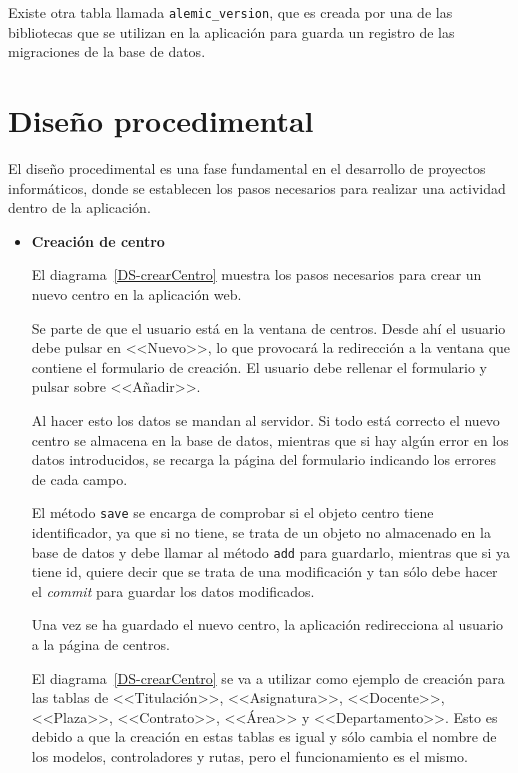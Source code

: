 Existe otra tabla llamada \texttt{alemic\_version}, que es creada por una de las bibliotecas que se utilizan en la aplicación para guarda un registro de las migraciones de la base de datos. 

\section{Diseño procedimental}
El diseño procedimental es una fase fundamental en el desarrollo de proyectos informáticos, donde se establecen los pasos necesarios para realizar una actividad dentro de la aplicación.

\begin{itemize}
\item \textbf{Creación de centro}

El diagrama~\ref{DS-crearCentro} muestra los pasos necesarios para crear un nuevo centro en la aplicación web.

Se parte de que el usuario está en la ventana de centros.
Desde ahí el usuario debe pulsar en <<Nuevo>>, lo que provocará la redirección a la ventana que contiene el formulario de creación.
El usuario debe rellenar el formulario y pulsar sobre <<Añadir>>.

Al hacer esto los datos se mandan al servidor.
Si todo está correcto el nuevo centro se almacena en la base de datos, mientras que si hay algún error en los datos introducidos, se recarga la página del formulario indicando los errores de cada campo.

El método \texttt{save} se encarga de comprobar si el objeto centro tiene identificador, ya que si no tiene, se trata de un objeto no almacenado en la base de datos y debe llamar al método \texttt{add} para guardarlo, mientras que si ya tiene id, quiere decir que se trata de una modificación y tan sólo debe hacer el \textit{commit} para guardar los datos modificados.

Una vez se ha guardado el nuevo centro, la aplicación redirecciona al usuario a la página de centros.

El diagrama~\ref{DS-crearCentro} se va a utilizar como ejemplo de creación para las tablas de <<Titulación>>, <<Asignatura>>, <<Docente>>, <<Plaza>>, <<Contrato>>, <<Área>> y <<Departamento>>.
Esto es debido a que la creación en estas tablas es igual y sólo cambia el nombre de los modelos, controladores y rutas, pero el funcionamiento es el mismo.


\end{itemize}
